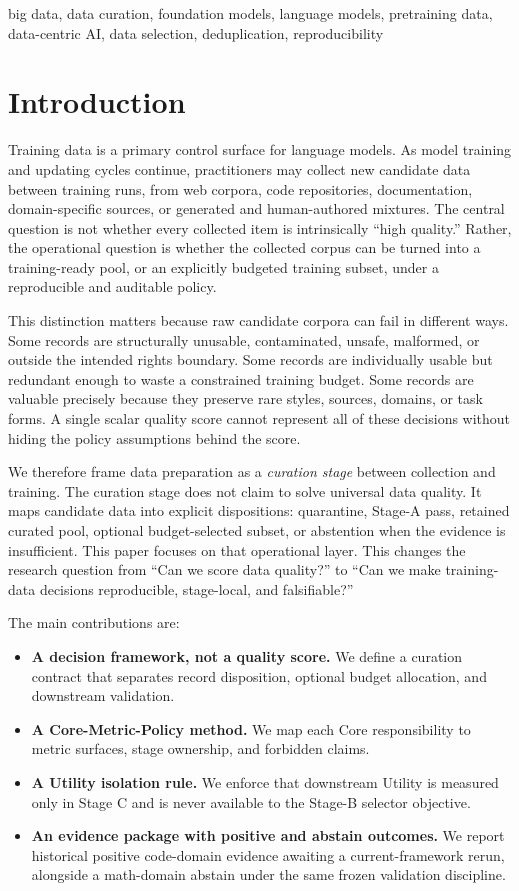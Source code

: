 \documentclass[conference]{IEEEtran}
\begin{document}
\begin{IEEEkeywords}
big data, data curation, foundation models, language models, pretraining data,
data-centric AI, data selection, deduplication, reproducibility
\end{IEEEkeywords}

\section{Introduction}
Training data is a primary control surface for language models.  As model
training and updating cycles continue, practitioners may collect new candidate
data between training runs, from web corpora, code repositories, documentation,
domain-specific sources, or generated and human-authored mixtures.  The central
question is not whether every collected item is intrinsically ``high quality.''
Rather, the operational question is whether the collected corpus can be turned
into a training-ready pool, or an explicitly budgeted training subset, under a
reproducible and auditable policy.

This distinction matters because raw candidate corpora can fail in different
ways.  Some records are structurally unusable, contaminated, unsafe, malformed,
or outside the intended rights boundary.  Some records are individually usable
but redundant enough to waste a constrained training budget.  Some records are
valuable precisely because they preserve rare styles, sources, domains, or
task forms.  A single scalar quality score cannot represent all of these
decisions without hiding the policy assumptions behind the score.

We therefore frame data preparation as a \emph{curation stage} between
collection and training.  The curation stage does not claim to solve universal
data quality.  It maps candidate data into explicit dispositions: quarantine,
Stage-A pass, retained curated pool, optional budget-selected subset, or
abstention when the evidence is insufficient.  This paper focuses on that
operational layer.  This changes the research question from ``Can we score data
quality?'' to ``Can we make training-data decisions reproducible, stage-local,
and falsifiable?''

The main contributions are:
\begin{itemize}
    \item \textbf{A decision framework, not a quality score.}  We define a
    curation contract that separates record disposition, optional budget
    allocation, and downstream validation.
    \item \textbf{A Core-Metric-Policy method.}  We map each Core
    responsibility to metric surfaces, stage ownership, and forbidden claims.
    \item \textbf{A Utility isolation rule.}  We enforce that downstream
    Utility is measured only in Stage C and is never available to the Stage-B
    selector objective.
    \item \textbf{An evidence package with positive and abstain outcomes.}  We
    report historical positive code-domain evidence awaiting a current-framework
    rerun, alongside a math-domain abstain under the same frozen validation
    discipline.
\end{itemize}
\end{document}
